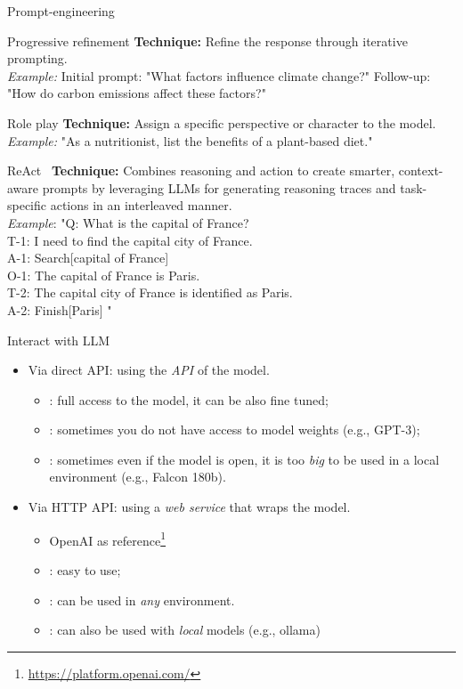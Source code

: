\documentclass[presentation, 10pt]{beamer}\mode<presentation>{\usetheme{AMSBolognaFC}}
\begin{document}
\begin{frame}[allowframebreaks]{Prompt-engineering}
\begin{exampleblock}{Progressive refinement}
	\textbf{Technique:} Refine the response through iterative prompting. \\
	\emph{Example:} Initial prompt: "What factors influence climate change?" Follow-up: "How do carbon emissions affect these factors?"
	\end{exampleblock}
\begin{exampleblock}{Role play}
\textbf{Technique:} Assign a specific perspective or character to the model. \\
\emph{Example:} "As a nutritionist, list the benefits of a plant-based diet."
\end{exampleblock}
\begin{exampleblock}{ReAct~\cite{yao2022react}}
\textbf{Technique:} Combines reasoning and action to create smarter, context-aware prompts by leveraging LLMs for generating reasoning traces and task-specific actions in an interleaved manner. \\
\emph{Example}: 
"Q: What is the capital of France?\\
T-1: I need to find the capital city of France.\\
A-1: Search[capital of France]\\
O-1: The capital of France is Paris.\\
T-2: The capital city of France is identified as Paris.\\
A-2: Finish[Paris]
"
\end{exampleblock}
\end{frame}
\begin{frame}{Interact with LLM}
	\begin{itemize}
		\item Via direct API: using the \emph{API} of the model. 
		\begin{itemize}
			\item \faThumbsUp: full access to the model, it can be also fine tuned;
			\item \faThumbsDown: sometimes you do not have access to model weights (e.g., GPT-3);
			\item \faThumbsDown: sometimes even if the model is open, it is too \emph{big} to be used in a local environment (e.g., Falcon 180b).
		\end{itemize}
		\item Via HTTP API: using a \emph{web service} that wraps the model.
		\begin{itemize}
			\item OpenAI as reference\footnote{\url{https://platform.openai.com/}}
			\item \faThumbsUp: easy to use;
			\item \faThumbsUp: can be used in \emph{any} environment.
			\item \faThumbsUp: can also be used with \emph{local}
			models (e.g., ollama)
		\end{itemize}
	\end{itemize}
\end{frame}
\end{document}
